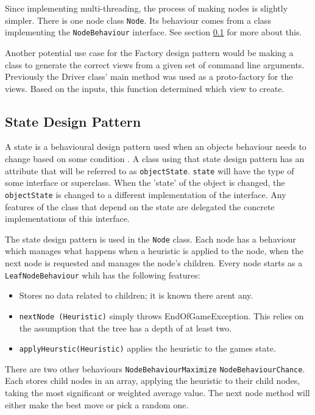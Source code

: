 \documentclass{article}
\begin{document}
Since implementing multi-threading, the process of making nodes is slightly simpler. There is one node class \texttt{Node}. Its behaviour comes from a class implementing the \texttt{NodeBehaviour} interface. See section \ref{subsec:state} for more about this.

Another potential use case for the Factory design pattern would be making a class to generate the correct views from a given set of command line arguments. Previously the Driver class' main method was used as a proto-factory for the views. Based on the inputs, this function determined which view to create.


\subsection{State Design Pattern}
\label{subsec:state}
A state is a behavioural design pattern used when an object\textquotesingle s behaviour needs to change based on some condition \cite{CS2800_behavioural}. A class using that state design pattern has an attribute that will be referred to as \texttt{objectState}. \texttt{state} will have the type of some interface or superclass. When the 'state' of the object is changed, the \texttt{objectState} is changed to a different implementation of the interface. Any features of the class that depend on the state are delegated the concrete implementations of this interface.

The state design pattern is used in the \texttt{Node} class. Each node has a behaviour which manages what happens when a heuristic is applied to the node, when the next node is requested and manages the node's children. Every node starts as a \texttt{LeafNodeBehaviour} whih has the following features:
\begin{itemize}
    \item Stores no data related to children; it is known there aren\textquotesingle t any.
    \item \texttt{nextNode (Heuristic)} simply throws EndOfGameException. This relies on the assumption that the tree has a depth of at least two.
    \item \texttt{applyHeurstic(Heuristic)} applies the heuristic to the games state.
\end{itemize}

There are two other behaviours \texttt{NodeBehaviourMaximize} \texttt{NodeBehaviourChance}. Each stores child nodes in an array, applying the heuristic to their child nodes, taking the most significant or weighted average value. The next node method will either make the best move or pick a random one.
\end{document}
